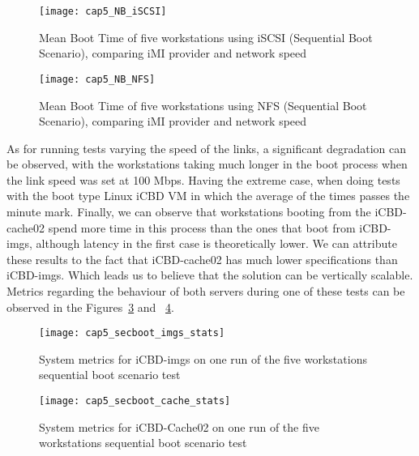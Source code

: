 \begin{figure}[htbp]
	\centering
	\texttt{[image: cap5\_NB\_iSCSI]}
	\caption{Mean Boot Time of five workstations using iSCSI (Sequential Boot Scenario), comparing iMI provider and network speed}
	\label{fig:boot_iscsi}
\end{figure}

\begin{figure}[htbp]
	\centering
	\texttt{[image: cap5\_NB\_NFS]}
	\caption{Mean Boot Time of five workstations using NFS (Sequential Boot Scenario), comparing iMI provider and network speed}
	\label{fig:boot_nfs}
\end{figure}


As for running tests varying the speed of the links, a significant degradation can be observed, with the workstations taking much longer in the boot process when the link speed was set at 100 Mbps.
Having the extreme case, when doing tests with the boot type Linux iCBD VM in which the average of the times passes the minute mark.
Finally, we can observe that workstations booting from the iCBD-cache02 spend more time in this process than the ones that boot from iCBD-imgs, although latency in the first case is theoretically lower. We can attribute these results to the fact that iCBD-cache02 has much lower specifications than iCBD-imgs. Which leads us to believe that the solution can be vertically scalable. Metrics regarding the behaviour of both servers during one of these tests can be observed in the Figures~\ref{fig:boot_imgs_stats} and ~\ref{fig:boot_cache_stats}.


\begin{figure}[htbp]
	\centering
	\texttt{[image: cap5\_secboot\_imgs\_stats]}
	\caption{System metrics for iCBD-imgs on one run of the five workstations sequential boot scenario test}
	\label{fig:boot_imgs_stats}
\end{figure}


\begin{figure}[htbp]
	\centering
	\texttt{[image: cap5\_secboot\_cache\_stats]}
	\caption{System metrics for iCBD-Cache02 on one run of the five workstations sequential boot scenario test}
	\label{fig:boot_cache_stats}
\end{figure}



